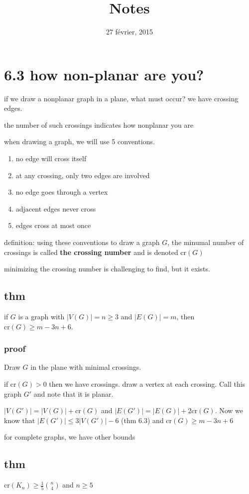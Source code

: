 \documentclass[letterpaper]{article}
\begin{document}
\title{Notes}
\date{27 février, 2015}
\maketitle
\section*{6.3 how non-planar are you?}
if we draw a nonplanar graph in a plane, what must occur? we have crossing edges.

the number of such crossings indicates how nonplanar you are

when drawing a graph, we will use 5 conventions.

\begin{enumerate}
\item
no edge will cross itself
\item
at any crossing, only two edges are involved
\item
no edge goes through a vertex
\item
adjacent edges never cross
\item
edges cross at most once
\end{enumerate}

definition: using these conventions to draw a graph $G$, the minumal number of crossings is called {\bfseries the crossing number} and is denoted $\text{cr}(G)$

minimizing the crossing number is challenging to find, but it exists.

\subsection*{thm}
if $G$ is a graph with $|V(G)|=n\ge 3$ and $|E(G)|=m$, then $\text{cr}(G)\ge m-3n+6$. 
\subsubsection*{proof}
Draw $G$ in the plane with minimal crossings.

if $\text{cr}(G)>0$ then we have crossings. draw a vertex at each crossing. Call this graph $G'$ and note that it is planar.

$|V(G')|=|V(G)|+\text{cr}(G)$ and $|E(G')|=|E(G)|+2\text{cr}(G)$. Now we know that $|E(G')|\le 3|V(G')|-6$ (thm 6.3) and $\text{cr}(G)\ge m-3n+6$

for complete graphs, we have other bounds

\subsection*{thm}
$\text{cr}(K_n)\ge\frac{1}{5}\binom{n}{4}$ and $n\ge 5$
\end{document}

